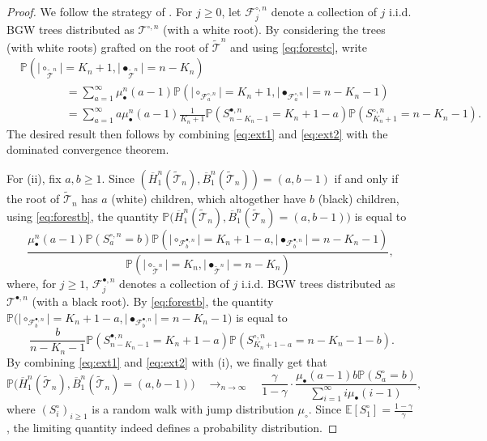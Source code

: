 \documentclass[AHL,XML,longabstracts,Unicode]{cedram}
\providecommand{\abs}[1]{\lvert#1\rvert}
\def\mub{\mu_{\bullet}}
\def\muc{\mu_{\circ}}
\def\mubn{\mu_{\bullet}^{n}}
\def\Sbn{S^{\bullet,n}}
\def\Scn{S^{\circ,n}}
\def\oB{\overline{B}}
\def\oH{\overline{H}}
\def\tTs{\tilde{\Ts}}
\def \Tsbn{\Ts^{\bullet,n}}
\def \Tscn{\Ts^{\circ,n}}
\def\Ts{\mathscr{T}}
\newcommand\Es[1]{\mathbb{E}\left[#1\right]}
\renewcommand\Pr[1]{\mathbb{P}\left(#1\right)}
\newcommand\Prb[1]{\mathbb{P}\big(#1\big)}
\begin{document}
\begin{proof} We follow the strategy of \cite[Lemma 5.7]{KM16}.
For $j \geq 0$, let $ \mathscr{F}^{\circ,n}_{j}$ denote a collection of $j$ i.i.d. BGW trees distributed as  $ \Tscn$ (with a white root). By considering the trees (with white roots) grafted on the root of $\tTs^{n}$  and using \eqref{eq:forestc}, write
\begin{align*}
&\Pr{\abs{\circ_{\tTs^{n}}}=K_{n}+1, \abs{\bullet_{\tTs^{n}}}=n-K_{n}} \\
& \qquad\qquad = \sum_{a=1}^{\infty} \mubn(a-1) \Pr{\abs{ \circ_{ \mathscr{F}^{\circ,n}_{a}}}=K_{n}+1, \abs{\bullet_{ \mathscr{F}^{\circ,n}_{a}}}=n-K_n-1} \\
& \qquad \qquad =\sum_{a=1}^{\infty} a \mubn(a-1) \frac{1}{K_{n}+1} \Pr{\Sbn_{n-K_{n}-1}=K_{n}+1-a} \Pr{\Scn_{K_{n}+1}=n-K_{n}-1}.
\end{align*}
The desired result then follows by combining \eqref{eq:ext1} and \eqref{eq:ext2} with the dominated convergence theorem.



For (ii), fix $a,b \geq 1$. Since $(\oH^{n}_{1}(\tTs_{n}),\oB^{n}_{1}(\tTs_{n}))=(a,b-1)$ if and only if the root of $\tTs_{n}$ has $a$ (white) children, which altogether have $b$ (black) children, using \eqref{eq:forestb},  the quantity $\Prb{\oH^{n}_{1}(\tTs_{n}),\oB^{n}_{1}(\tTs_{n})=(a,b-1)}$ is equal to
\[
 \frac{\mubn(a-1) \Pr{\Scn_{a}=b}  \Pr{\abs{ \circ_{ \mathscr{F}^{\bullet,n}_{b}}}=K_{n}+1-a, \abs{\bullet_{ \mathscr{F}^{\bullet,n}_{b}}}=n-K_n-1}}{\Pr{\abs{\circ_{\tTs^{n}}}=K_{n}, \abs{\bullet_{\tTs^{n}}}=n-K_{n}}},
\]
where, for $j \geq 1$,  $ \mathscr{F}^{\bullet,n}_{j}$ denotes a collection of $j$ i.i.d. BGW trees distributed as  $ \Tsbn$ (with a black root).
By \eqref{eq:forestb}, the quantity $\Prb{\abs{ \circ_{ \mathscr{F}^{\bullet,n}_{b}}}=K_{n}+1-a, \abs{\bullet_{ \mathscr{F}^{\bullet,n}_{b}}}=n-K_n-1}$ is equal to
\[\ \frac{b}{n-K_{n}-1} \Pr{\Sbn_{n-K_{n}-1}=K_{n}+1-a} \Pr{\Scn_{K_{n}+1-a} =n-K_{n}-1-b}.\]
 By  combining \eqref{eq:ext1} and \eqref{eq:ext2} with (i), we finally get that
 \[\Prb{\oH^{n}_{1}(\tTs_{n}),\oB^{n}_{1}(\tTs_{n})=(a,b-1)}  \quad \mathop{\longrightarrow}_{n \rightarrow \infty} \quad  \frac{\gamma}{1-\gamma} \cdot \frac{\mub(a-1)  b\Pr{S^{\circ}_{a}=b}}{\sum_{i=1}^{\infty} i \mub(i-1)},\]
 where $(S^{\circ}_{i})_{i \geq 1}$ is a random walk with jump distribution $\muc$.
Since $\Es{S^{\circ}_{1}}= \frac{1-\gamma}{\gamma}$, the limiting quantity indeed defines a probability distribution.


\end{proof}
\end{document}
